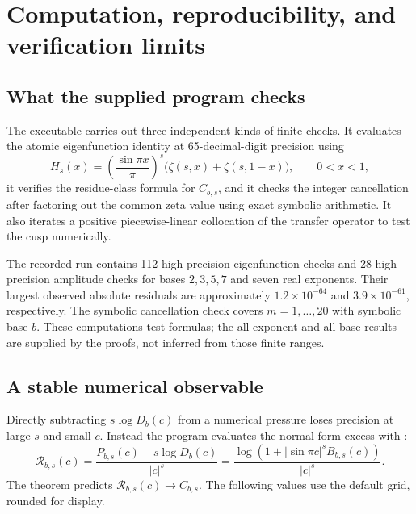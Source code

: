 \documentclass[11pt,a4paper]{article}
\numberwithin{equation}{section}
\theoremstyle{definition}
\theoremstyle{remark}
\newcommand{\code}[1]{\texttt{\detokenize{#1}}}
\begin{document}
\section{Computation, reproducibility, and verification limits}
\label{sec:checks}

\subsection{What the supplied program checks}
The executable \code{code/verify.py} carries out three independent kinds
of finite checks. It evaluates the atomic eigenfunction identity at
65-decimal-digit precision using
\begin{equation}
 H_s(x)=\left(\frac{\sin\pi x}{\pi}\right)^s
 \bigl(\zeta(s,x)+\zeta(s,1-x)\bigr),\qquad 0<x<1,
 \label{eq:hurwitz}
\end{equation}
it verifies the residue-class formula for $C_{b,s}$, and it checks the
integer cancellation after factoring out the common zeta value using
exact symbolic arithmetic. It also iterates a positive piecewise-linear
collocation of the transfer operator to test the cusp numerically.

The recorded run contains 112 high-precision eigenfunction checks and
28 high-precision amplitude checks for bases $2,3,5,7$ and seven real
exponents. Their largest observed absolute residuals are approximately
$1.2\times10^{-64}$ and $3.9\times10^{-61}$, respectively. The symbolic
cancellation check covers $m=1,\ldots,20$ with symbolic base $b$.
These computations test formulas; the all-exponent and all-base results
are supplied by the proofs, not inferred from those finite ranges.

\subsection{A stable numerical observable}
Directly subtracting $s\log D_b(c)$ from a numerical pressure loses
precision at large $s$ and small $c$. Instead the program evaluates the
normal-form excess with \code{log1p}:
\begin{equation}
 \mathcal R_{b,s}(c)=
 \frac{P_{b,s}(c)-s\log D_b(c)}{|c|^s}
 =\frac{\log(1+|\sin\pi c|^sB_{b,s}(c))}{|c|^s}.
 \label{eq:numeric-ratio}
\end{equation}
The theorem predicts $\mathcal R_{b,s}(c)\to C_{b,s}$. The following
values use the default grid, rounded for display.
\end{document}
